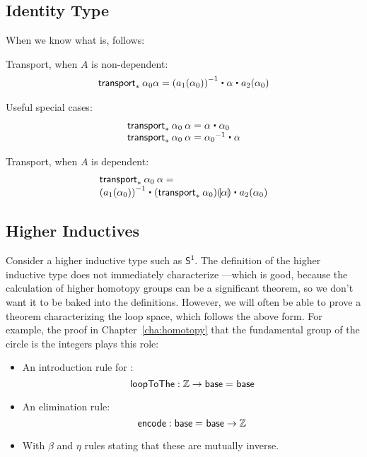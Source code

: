 \subsection{Identity Type}

When we know what \id[A]{}{} is, \id[ {\id[A]{}{}} ]{}{} follows:

Transport, when $A$ is non-dependent:
\[
\begin{array}{l}
\transport{x_0:A_0 \mapsto \id[A] {a_1(x_0)}{a_2(x_0)}} {\alpha_0}{\alpha} = 
\opp{(\map{a_1}{\alpha_0})} \ct \alpha \ct \map{a_2}{\alpha_0}
\end{array}
\]

Useful special cases:
\[
\begin{array}{l}
\transport{x:A \mapsto \id[A] {a}{x}} {\alpha_0} \: {\alpha} = \alpha \ct \alpha_0 \\
\transport{x:A \mapsto \id[A] {x_0}{a}} {\alpha_0} \: {\alpha} = \opp {\alpha_0} \ct \alpha \\
\end{array}
\]

Transport, when $A$ is dependent:
\[
\begin{array}{l}
\transport{x_0:A_0 \mapsto \id[A(x_0)] {a_1(x_0)}{a_2(x_0)}} {\alpha_0} \: {\alpha} = \\
\opp{(\map{a_1}{\alpha_0})} \ct \mapdep{(\transport{A}{\alpha_0})}{\alpha} \ct \map{a_2}{\alpha_0}
\end{array}
\]

\subsection{Higher Inductives}

\newcommand{\sone}{\mathsf{S^1}}

Consider a higher inductive type such as $\sone$.  The definition of the
higher inductive type does not immediately characterize
\id[\sone]{x}{y}---which is good, because the calculation of higher
homotopy groups can be a significant theorem, so we don't want it to be
baked into the definitions.  However, we will often be able to prove a
theorem characterizing the loop space, which follows the above form.
For example, the proof in Chapter~\ref{cha:homotopy} that the fundamental
group of the circle is the integers plays this role:

\begin{itemize}
\item An introduction rule for \id[\sone]{\mathsf{base}}{\mathsf{base}}:
  \[
  \mathsf{loopToThe} : \mathbb{Z} \to \mathsf{base} =_{} \mathsf{base}
  \]
\item An elimination rule:
  \[
  \mathsf{encode} : \mathsf{base} =_{} \mathsf{base} \to \mathbb{Z}
  \]
\item With $\beta$ and $\eta$ rules stating that these are mutually inverse.
\end{itemize}

